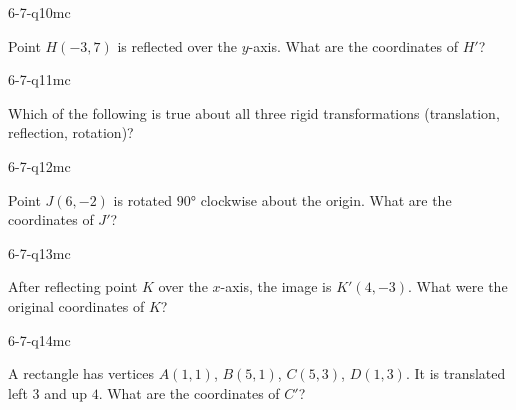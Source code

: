 \begin{practiceQuestion}{6-7-q10}{mc}
\begin{questionText}
Point $H(-3, 7)$ is reflected over the $y$-axis. What are the coordinates of $H'$?
\end{questionText}
\end{practiceQuestion}

\begin{practiceQuestion}{6-7-q11}{mc}
\begin{questionText}
Which of the following is true about all three rigid transformations (translation, reflection, rotation)?
\end{questionText}
\end{practiceQuestion}

\begin{practiceQuestion}{6-7-q12}{mc}
\begin{questionText}
Point $J(6, -2)$ is rotated $90°$ clockwise about the origin. What are the coordinates of $J'$?
\end{questionText}
\end{practiceQuestion}

\begin{practiceQuestion}{6-7-q13}{mc}
\begin{questionText}
After reflecting point $K$ over the $x$-axis, the image is $K'(4, -3)$. What were the original coordinates of $K$?
\end{questionText}
\end{practiceQuestion}

\begin{practiceQuestion}{6-7-q14}{mc}
\begin{questionText}
A rectangle has vertices $A(1, 1)$, $B(5, 1)$, $C(5, 3)$, $D(1, 3)$. It is translated left $3$ and up $4$. What are the coordinates of $C'$?
\end{questionText}
\end{practiceQuestion}

